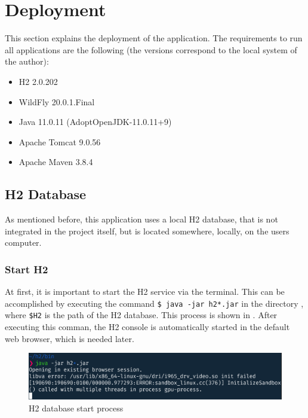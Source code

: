 \section{Deployment}\label{sec:03_depl}
This section explains the deployment of the application.
The requirements to run all applications are the following (the versions correspond to the local system of the author):
\begin{itemize}
\item H2 2.0.202
\item WildFly 20.0.1.Final
\item Java 11.0.11 (AdoptOpenJDK-11.0.11+9)
\item Apache Tomcat 9.0.56
\item Apache Maven 3.8.4
\end{itemize}


\subsection{H2 Database}\label{sec:03_depl_h2}
As mentioned before, this application uses a local H2 database, that is not integrated in the project itself, but is located somewhere, locally, on the users computer.

\subsubsection{Start H2}\label{sec:03_depl_h2_start}
At first, it is important to start the H2 service via the terminal. This can be accomplished by executing the command \texttt{\$ java -jar h2*.jar} in the directory , where \texttt{\$H2} is the path of the H2 database. This process is shown in . After executing this comman, the H2 console is automatically started in the default web browser, which is needed later.
\begin{figure}[h]
\centering
\includegraphics[scale=0.23]{images/03_depl/h2_start}
\caption{H2 database start process}
\label{fig:03_depl_h2_h2start}
\end{figure}

